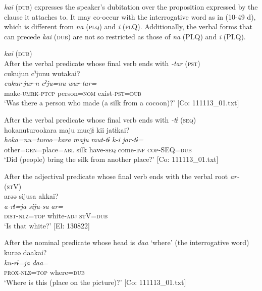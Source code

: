 \textit{kai} (\textsc{dub}) expresses the speaker’s dubitation over the proposition expressed by the clause it attaches to. It may co-occur with the interrogative word as in (10-49 d), which is different from \textit{na} (\textsc{plq}) and \textit{i} (\textsc{pl}Q). Additionally, the verbal forms that can precede \textit{kai} (\textsc{dub}) are not so restricted as those of \textit{na} (PLQ) and \textit{i} (PLQ).

\ea\label{ex:10.49}   \textit{kai} (\textsc{dub})\\
  \ea After the verbal predicate whose final verb ends with \textit{{}-tar} (\textsc{pst})\\
      \glll    cukujun  cˀjunu  wutakai?\\
    \textit{cukur-jur-n}  \textit{cˀju=nu}  \textit{wur-tar=}\\
    make-\textsc{umrk}-\textsc{ptcp}  person=\textsc{nom}  exist-\textsc{pst}=\textsc{dub}\\
\glt     ‘Was there a person who made (a silk from a cocoon)?’  [Co: 111113\_01.txt]

  \ex After the verbal predicate whose final verb ends with \textit{{}-tɨ} (\textsc{seq})\\
      \glll    {\textbar}hoka{\textbar}nuturookara  maju  mucjɨ  kii  jatɨkai?\\
    \textit{hoka=nu=turoo=kara}  \textit{maju}  \textit{mut-tɨ}  \textit{k-i}  \textit{jar-tɨ=}\\
    other=\textsc{gen}=place=\textsc{abl}  silk  have-\textsc{seq}  come-\textsc{inf}  \textsc{cop}-SEQ=\textsc{dub}\\
\glt     ‘Did (people) bring the silk from another place?’  [Co: 111113\_01.txt]

  \ex After the adjectival predicate whose final verb ends with the verbal root \textit{ar-} (\textsc{st}V)\\
      \glll    arəə  sijusa  akkai?\\
    \textit{a-rɨ=ja}  \textit{siju-sa}  \textit{ar=}\\
    \textsc{dist}-\textsc{nlz}=\textsc{top}  white-\textsc{adj}  \textsc{st}V=\textsc{dub}\\
    \glt     ‘Is that white?’ [El: 130822]

  \ex After the nominal predicate whose head is \textit{daa} ‘where’ (the interrogative word)\\
      \glll    kurəə  daakai?\\
    \textit{ku-rɨ=ja}  \textit{daa=}\\
    \textsc{prox}-\textsc{nlz}=\textsc{top}  where=\textsc{dub}\\
\glt     ‘Where is this (place on the picture)?’  [Co: 111113\_01.txt]

